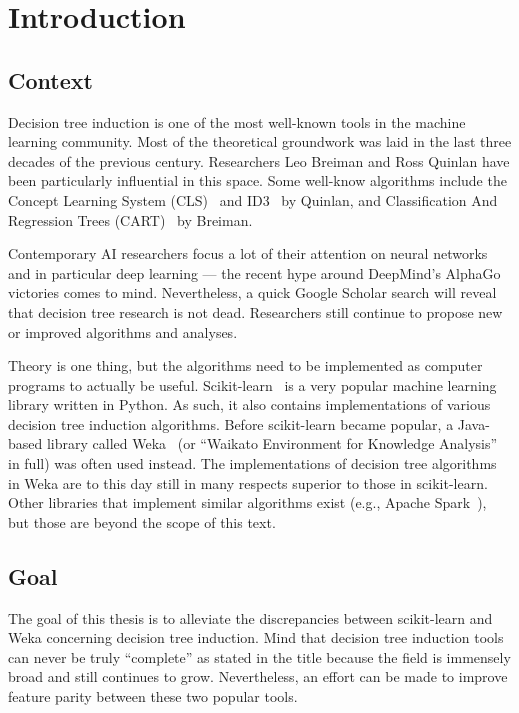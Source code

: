 \chapter{Introduction}\label{cha:intro}

\section{Context}
Decision tree induction is one of the most well-known tools in the machine learning community. Most of the theoretical groundwork was laid in the last three decades of the previous century. Researchers Leo Breiman and Ross Quinlan have been particularly influential in this space. Some well-know algorithms include the Concept Learning System (CLS)~\cite{cls} and ID3~\cite{id3, id3bis, id3ter} by Quinlan, and Classification And Regression Trees (CART)~\cite{cart} by Breiman. 

Contemporary AI researchers focus a lot of their attention on neural networks and in particular deep learning --- the recent hype around DeepMind's AlphaGo~\cite{alphago} victories comes to mind. Nevertheless, a quick Google Scholar search will reveal that decision tree research is not dead. Researchers still continue to propose new or improved algorithms and analyses.

Theory is one thing, but the algorithms need to be implemented as computer programs to actually be useful. Scikit-learn~\cite{scikit-learn} is a very popular machine learning library written in Python. As such, it also contains implementations of various decision tree induction algorithms. Before scikit-learn became popular, a Java-based library called Weka~\cite{eibe2016weka} (or ``Waikato Environment for Knowledge Analysis'' in full) was often used instead. The implementations of decision tree algorithms in Weka are to this day still in many respects superior to those in scikit-learn. Other libraries that implement similar algorithms exist (e.g., Apache Spark~\cite{spark}), but those are beyond the scope of this text.

\section{Goal}
The goal of this thesis is to alleviate the discrepancies between scikit-learn and Weka concerning decision tree induction. Mind that decision tree induction tools can never be truly ``complete'' as stated in the title because the field is immensely broad and still continues to grow. Nevertheless, an effort can be made to improve feature parity between these two popular tools.


